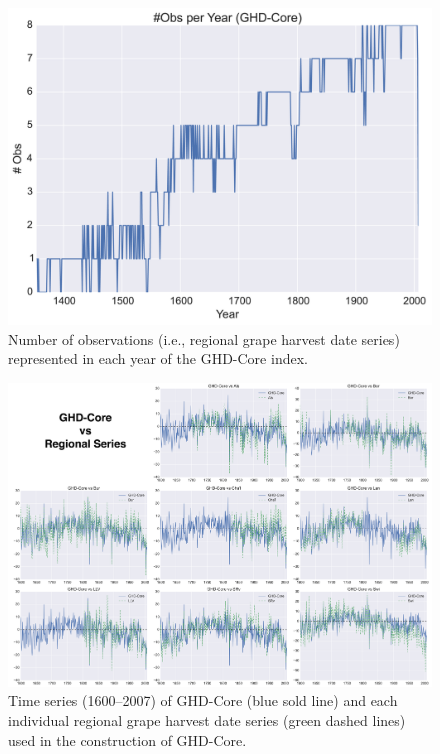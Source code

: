 \documentclass[12pt]{article}
\begin{document}
\begin{figure}
\center
\includegraphics[width=1.0\columnwidth,scale=2]{SUPP_fig_02_numobs.png}
\caption{Number of observations (i.e., regional grape harvest date series) represented in each year of the GHD-Core index.}
\end{figure}

\begin{figure}
\center
\includegraphics[width=1.0\columnwidth,scale=2]{SUPP_fig_03_core_vs_sites.png}
\caption{Time series (1600--2007) of GHD-Core (blue sold line) and each individual regional grape harvest date  series (green dashed lines) used in the construction of GHD-Core.}
\end{figure}
\end{document}
